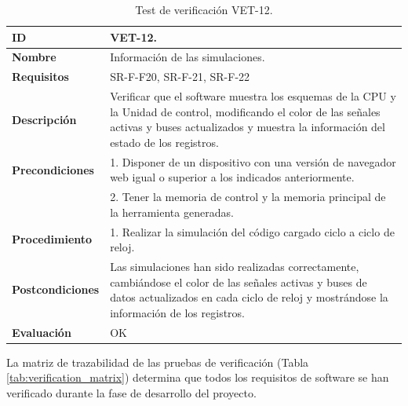 \begin{center}
\begin{table}[htb]
\centering
\caption{Test de verificación VET-12.}
\begin{tabular}{@{}p{2.5cm} p{13cm}@{}} 
\toprule
\textbf{ID} 					& VET-12. \\
\midrule
\textbf{Nombre} 				& Información de las simulaciones. \\
\midrule
\textbf{Requisitos} 		& SR-F-F20, SR-F-21, SR-F-22\\
\midrule
\textbf{Descripción} 		& Verificar que el software muestra los esquemas de la CPU y la Unidad de control, modificando el color de las señales activas y buses actualizados y muestra la información del estado de los registros. \\
\midrule
\textbf{Precondiciones}		& 1. Disponer de un dispositivo con una versión de navegador web igual o superior a los indicados anteriormente. \\
											& 2. Tener la memoria de control y la memoria principal de la herramienta generadas. \\
\midrule
\textbf{Procedimiento}		& 1. Realizar la simulación del código cargado ciclo a ciclo de reloj.\\
\midrule
\textbf{Postcondiciones} 		&  Las simulaciones han sido realizadas correctamente, cambiándose el color de las señales activas y buses de datos actualizados en cada ciclo de reloj y mostrándose la información de los registros.\\
\midrule
\textbf{Evaluación} 			& OK \\
\bottomrule
\end{tabular}
\label{tab:vet12}
\end{table}
\end{center}

\clearpage



La matriz de trazabilidad de las pruebas de verificación (Tabla \ref{tab:verification_matrix}) determina que todos los requisitos de software se han verificado durante la fase de desarrollo del proyecto.

\vspace{2cm}


